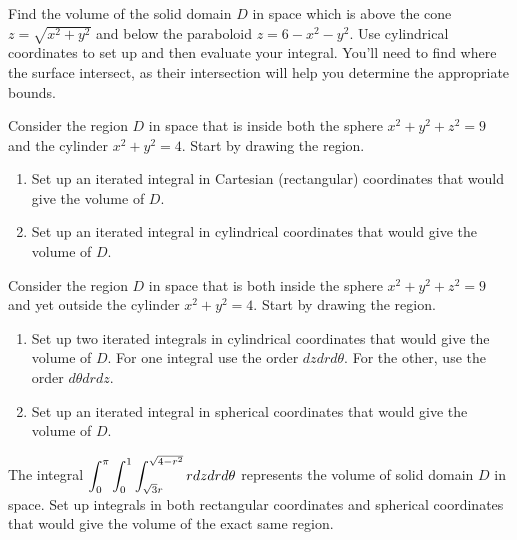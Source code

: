 \begin{problem}%
Find the volume of the solid domain $D$ in space which is above the cone $z=\sqrt{x^2+y^2}$ and below the paraboloid $z=6-x^2-y^2$. Use cylindrical coordinates to set up and then evaluate your integral.  You'll need to find where the surface intersect, as their intersection will help you determine the appropriate bounds.
\end{problem}

\begin{problem}
Consider the region $D$ in space that is inside both the sphere $x^2+y^2+z^2=9$ and the cylinder $x^2+y^2=4$. Start by drawing the region.
\begin{enumerate}
 \item Set up an iterated integral in Cartesian (rectangular) coordinates that would give the volume of $D$. 
 \item Set up an iterated integral in cylindrical coordinates that would give the volume of $D$. 
\end{enumerate}
\end{problem}

\begin{problem}
Consider the region $D$ in space that is both inside the sphere $x^2+y^2+z^2=9$ and yet outside the cylinder $x^2+y^2=4$. Start by drawing the region.
\begin{enumerate}
 \item Set up two iterated integrals in cylindrical coordinates that would give the volume of $D$. For one integral use the order $dzdrd\theta$.  For the other, use the order $d\theta dr dz$.
 \item Set up an iterated integral in spherical coordinates that would give the volume of $D$. 
\end{enumerate}
\end{problem}



\begin{problem}
The integral $\displaystyle\int_{0}^{\pi}\int_{0}^{1}\int_{\sqrt{3}r}^{\sqrt{4-r^2}}rdzdrd\theta$ represents the volume of solid domain $D$ in space. Set up integrals in both rectangular coordinates and spherical coordinates that would give the volume of the exact same region.
\end{problem}

